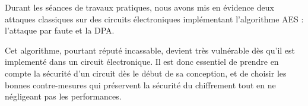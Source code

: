 Durant les séances de travaux pratiques, nous avons mis en évidence
deux attaques classiques sur des circuits électroniques implémentant
l'algorithme AES : l'attaque par faute et la DPA.

Cet algorithme, pourtant réputé incassable, devient très vulnérable
dès qu'il est implementé dans un circuit électronique.
Il est donc essentiel de prendre en compte la sécurité d'un circuit
dès le début de sa conception, et de choisir les bonnes contre-mesures
qui préservent la sécurité du chiffrement tout en ne négligeant pas
les performances.
